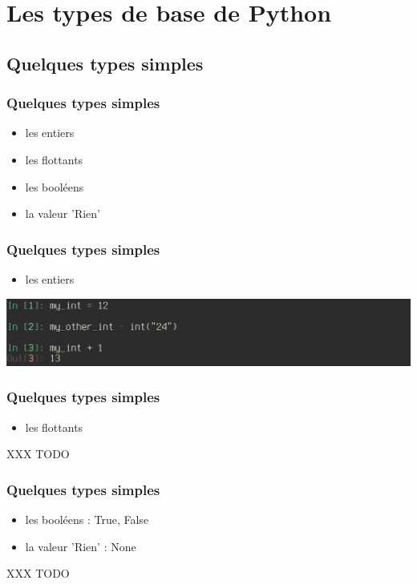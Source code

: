 \section{Les types de base de Python}
\subsection{Quelques types simples}

\begin{frame}
  \frametitle{Quelques types simples}
  \begin{itemize}
    \item<1-> les entiers
    \item<2-> les flottants
    \item<3-> les booléens
    \item<4-> la valeur 'Rien'
  \end{itemize}
\end{frame}

\begin{frame}
  \frametitle{Quelques types simples}
    \begin{itemize}
      \item les entiers
    \end{itemize}
    \includegraphics[scale=0.35]{type_int.png}
\end{frame}

\begin{frame}
  \frametitle{Quelques types simples}
    \begin{itemize}
      \item les flottants
    \end{itemize}
XXX TODO
\end{frame}

\begin{frame}
  \frametitle{Quelques types simples}
    \begin{itemize}
      \item les booléens : \alert{True, False}
      \item la valeur 'Rien' : \alert{None}
    \end{itemize}
XXX TODO
\end{frame}

